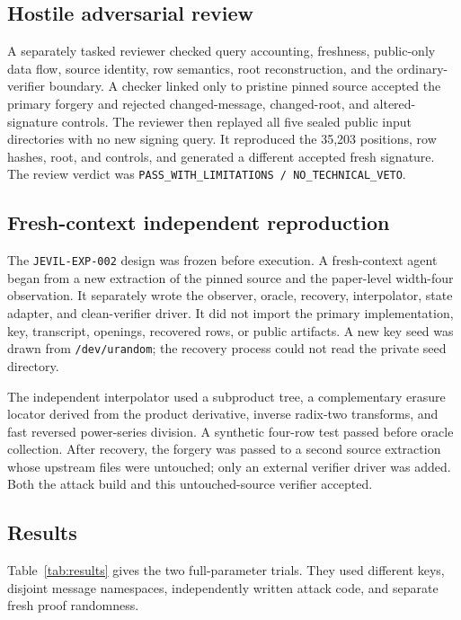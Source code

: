 \documentclass[10pt,a4paper]{article}
\begin{document}
\subsection{Hostile adversarial review}

A separately tasked reviewer checked query accounting, freshness, public-only
data flow, source identity, row semantics, root reconstruction, and the
ordinary-verifier boundary. A checker linked only to pristine pinned source
accepted the primary forgery and rejected changed-message, changed-root, and
altered-signature controls. The reviewer then replayed all five sealed public
input directories with no new signing query. It reproduced the 35,203
positions, row hashes, root, and controls, and generated a different accepted
fresh signature. The review verdict was
\texttt{PASS\_WITH\_LIMITATIONS / NO\_TECHNICAL\_VETO}.

\subsection{Fresh-context independent reproduction}

The \texttt{JEVIL-EXP-002} design was frozen before execution. A fresh-context
agent began from a new extraction of the pinned source and the paper-level
width-four observation. It separately wrote the observer, oracle, recovery,
interpolator, state adapter, and clean-verifier driver. It did not import the
primary implementation, key, transcript, openings, recovered rows, or public
artifacts. A new key seed was drawn from \texttt{/dev/urandom}; the recovery
process could not read the private seed directory.

The independent interpolator used a subproduct tree, a complementary erasure
locator derived from the product derivative, inverse radix-two transforms, and
fast reversed power-series division. A synthetic four-row test passed before
oracle collection. After recovery, the forgery was passed to a second source
extraction whose upstream files were untouched; only an external verifier
driver was added. Both the attack build and this untouched-source verifier
accepted.

\subsection{Results}

Table~\ref{tab:results} gives the two full-parameter trials. They used different
keys, disjoint message namespaces, independently written attack code, and
separate fresh proof randomness.
\end{document}

